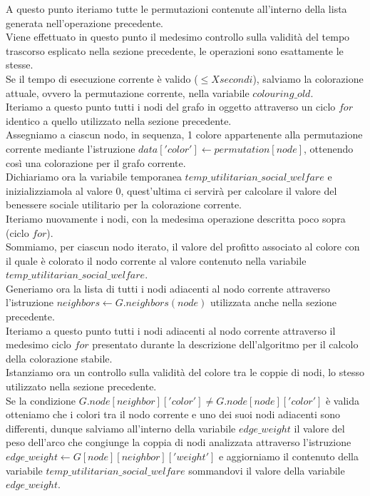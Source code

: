 A questo punto iteriamo tutte le permutazioni contenute all'interno della lista generata nell'operazione precedente.\\
Viene effettuato in questo punto il medesimo controllo sulla validità del tempo trascorso esplicato nella sezione precedente, le operazioni sono esattamente le stesse.\\
Se il tempo di esecuzione corrente è valido (\(\leq X secondi\)), salviamo la colorazione attuale, ovvero la permutazione corrente, nella variabile $colouring\_old$.\\

Iteriamo a questo punto tutti i nodi del grafo in oggetto attraverso un ciclo $for$ identico a quello utilizzato nella sezione precedente.\\
Assegniamo a ciascun nodo, in sequenza, 1 colore appartenente alla permutazione corrente mediante l'istruzione $data['color']\gets permutation[node]$, ottenendo così una colorazione per il grafo corrente.\\

Dichiariamo ora la variabile temporanea $temp\_utilitarian\_social\_welfare$ e inizializziamola al valore $0$, quest'ultima ci servirà per calcolare il valore del benessere sociale utilitario per la colorazione corrente.\\

Iteriamo nuovamente i nodi, con la medesima operazione descritta poco sopra (ciclo $for$).\\
Sommiamo, per ciascun nodo iterato, il valore del profitto associato al colore con il quale è colorato il nodo corrente al valore contenuto nella variabile $temp\_utilitarian\_social\_welfare$.\\

Generiamo ora la lista di tutti i nodi adiacenti al nodo corrente attraverso l'istruzione $neighbors\gets G.neighbors(node)$ utilizzata anche nella sezione precedente.\\
Iteriamo a questo punto tutti i nodi adiacenti al nodo corrente attraverso il medesimo ciclo $for$ presentato durante la descrizione dell'algoritmo per il calcolo della colorazione stabile.\\

Istanziamo ora un controllo sulla validità del colore tra le coppie di nodi, lo stesso utilizzato nella sezione precedente.\\

Se la condizione $G.node[neighbor]['color'] \neq G.node[node]['color']$ è valida otteniamo che i colori tra il nodo corrente e uno dei suoi nodi adiacenti sono differenti, dunque salviamo all'interno della variabile $edge\_weight$ il valore del peso dell'arco che congiunge la coppia di nodi analizzata attraverso l'istruzione $edge\_weight\gets G[node][neighbor]['weight']$ e aggiorniamo il contenuto della variabile $temp\_utilitarian\_social\_welfare$ sommandovi il valore della variabile $edge\_weight$.\\

